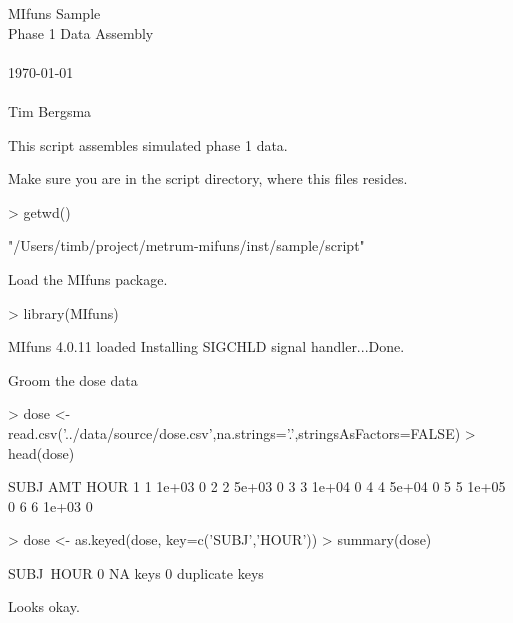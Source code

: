 
\usepackage{Sweave}

 

\vspace*{2cm}
\begin{center}
{\Large MIfuns Sample}\\
\vspace{1.5cm}
{\Large Phase 1 Data Assembly}\\
~\\
\today\\
~\\
Tim Bergsma\\
\end{center}
\newpage

This script assembles simulated phase 1 data.

Make sure you are in the script directory, where this files resides.
\begin{Schunk}
\begin{Sinput}
> getwd()
\end{Sinput}
\begin{Soutput}
[1] "/Users/timb/project/metrum-mifuns/inst/sample/script"
\end{Soutput}
\end{Schunk}
Load the MIfuns package.
\begin{Schunk}
\begin{Sinput}
> library(MIfuns)
\end{Sinput}
\begin{Soutput}
MIfuns 4.0.11 loaded
Installing SIGCHLD signal handler...Done.
\end{Soutput}
\end{Schunk}
Groom the dose data
\begin{Schunk}
\begin{Sinput}
> dose <- read.csv('../data/source/dose.csv',na.strings='.',stringsAsFactors=FALSE)
> head(dose)
\end{Sinput}
\begin{Soutput}
  SUBJ   AMT HOUR
1    1 1e+03    0
2    2 5e+03    0
3    3 1e+04    0
4    4 5e+04    0
5    5 1e+05    0
6    6 1e+03    0
\end{Soutput}
\begin{Sinput}
> dose <- as.keyed(dose, key=c('SUBJ','HOUR'))
> summary(dose)
\end{Sinput}
\begin{Soutput}
SUBJ~HOUR
0 NA keys
0 duplicate keys
\end{Soutput}
\end{Schunk}
Looks okay.

